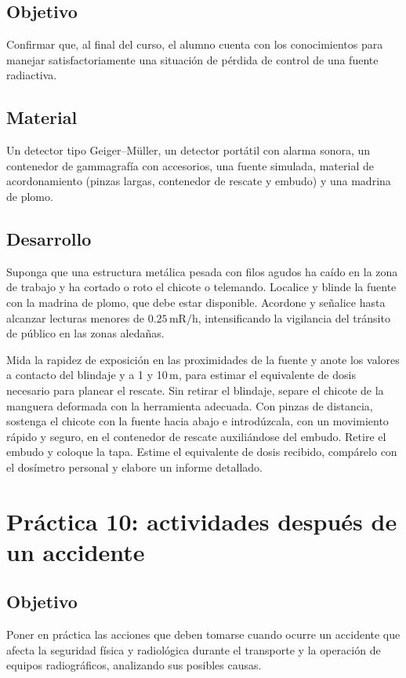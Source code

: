 \subsection*{Objetivo}
Confirmar que, al final del curso, el alumno cuenta con los conocimientos para manejar satisfactoriamente una situación de pérdida de control de una fuente radiactiva.

\subsection*{Material}
Un detector tipo Geiger--Müller, un detector portátil con alarma sonora, un contenedor de gammagrafía con accesorios, una fuente simulada, material de acordonamiento (pinzas largas, contenedor de rescate y embudo) y una madrina de plomo.

\subsection*{Desarrollo}
Suponga que una estructura metálica pesada con filos agudos ha caído en la zona de trabajo y ha cortado o roto el chicote o telemando. Localice y blinde la fuente con la madrina de plomo, que debe estar disponible. Acordone y señalice hasta alcanzar lecturas menores de $0.25\,\mathrm{mR/h}$, intensificando la vigilancia del tránsito de público en las zonas aledañas.

Mida la rapidez de exposición en las proximidades de la fuente y anote los valores a contacto del blindaje y a 1 y 10\,m, para estimar el equivalente de dosis necesario para planear el rescate. Sin retirar el blindaje, separe el chicote de la manguera deformada con la herramienta adecuada. Con pinzas de distancia, sostenga el chicote con la fuente hacia abajo e introdúzcala, con un movimiento rápido y seguro, en el contenedor de rescate auxiliándose del embudo. Retire el embudo y coloque la tapa. Estime el equivalente de dosis recibido, compárelo con el dosímetro personal y elabore un informe detallado.

\section{Práctica 10: actividades después de un accidente}

\subsection*{Objetivo}
Poner en práctica las acciones que deben tomarse cuando ocurre un accidente que afecta la seguridad física y radiológica durante el transporte y la operación de equipos radiográficos, analizando sus posibles causas.

